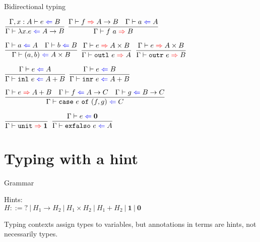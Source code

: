 \documentclass{beamer}
\newcommand{\pipe}{\ |\ }
\newcommand{\Fun}[2]{#1 \to #2}
\newcommand{\Prod}[2]{#1 \times #2}
\newcommand{\Sum}[2]{#1 + #2}
\newcommand{\Unit}{\textbf{1}}
\newcommand{\Empty}{\textbf{0}}
\newcommand{\fun}[2]{\lambda #1. #2}
\newcommand{\app}[2]{#1\ #2}
\newcommand{\pair}[2]{(#1, #2)}
\newcommand{\outl}[1][]{\texttt{outl}\ #1}
\newcommand{\outr}[1][]{\texttt{outr}\ #1}
\newcommand{\inl}[1][]{\texttt{inl}\ #1}
\newcommand{\inr}[1][]{\texttt{inr}\ #1}
\newcommand{\case}[3]{\texttt{case}\ #1\ \texttt{of}\ (#2, #3)}
\newcommand{\unit}{\texttt{unit}}
\newcommand{\elimEmpty}[1][]{\texttt{exfalso}\ #1}
\newcommand{\infrule}[3][]{\displaystyle \frac{#2}{#3} \textsc{\footnotesize{#1}}}
\newcommand{\extend}[3]{#1, #2 : #3}
\begin{document}
\begin{frame}{Bidirectional typing}

\begin{center}

  $\infrule{\fullcheck{\extend{\Gamma}{x}{A}}{e}{B}}{\check{\fun{x}{e}}{\Fun{A}{B}}}$ \quad
  $\infrule{\infer{f}{\Fun{A}{B}} \quad \check{a}{A}}{\infer{\app{f}{a}}{B}}$

  \vspace{2em}

  $\infrule{\check{a}{A} \quad \check{b}{B}}{\check{\pair{a}{b}}{\Prod{A}{B}}}$ \quad
  $\infrule{\infer{e}{\Prod{A}{B}}}{\infer{\outl[e]}{A}}$ \quad
  $\infrule{\infer{e}{\Prod{A}{B}}}{\infer{\outr[e]}{B}}$

  \vspace{2em}

  $\infrule{\check{e}{A}}{\check{\inl[e]}{\Sum{A}{B}}}$ \quad
  $\infrule{\check{e}{B}}{\check{\inr[e]}{\Sum{A}{B}}}$

  \vspace{2em}

  $\infrule{\infer{e}{\Sum{A}{B}} \quad \check{f}{\Fun{A}{C}} \quad \check{g}{\Fun{B}{C}}}{\check{\case{e}{f}{g}}{C}}$

  \vspace{2em}

  $\infrule{}{\infer{\unit}{\Unit}}$ \quad
  $\infrule{\check{e}{\Empty}}{\check{\elimEmpty[e]}{A}}$

\end{center}

\end{frame}

\section{Typing with a hint}

\newcommand{\fullhinting}[4]{#1 \vdash #2 \mathcolor{blue}{\Leftarrow} #3 \mathcolor{red}{\Rightarrow} #4}
\newcommand{\hinting}[3]{\fullhinting{\Gamma}{#1}{#2}{#3}}

\newcommand{\Hint}{\mathbf{?}}

\newcommand{\combinehints}[2]{#1 \sqcap #2}

\begin{frame}{Grammar}

Hints: \\
$H ::= \Hint \pipe \Fun{H_1}{H_2} \pipe \Prod{H_1}{H_2} \pipe \Sum{H_1}{H_2} \pipe \Unit \pipe \Empty$

\vspace{2em}

Typing contexts assign types to variables, but annotations in terms are hints, not necessarily types.

\end{frame}
\end{document}
